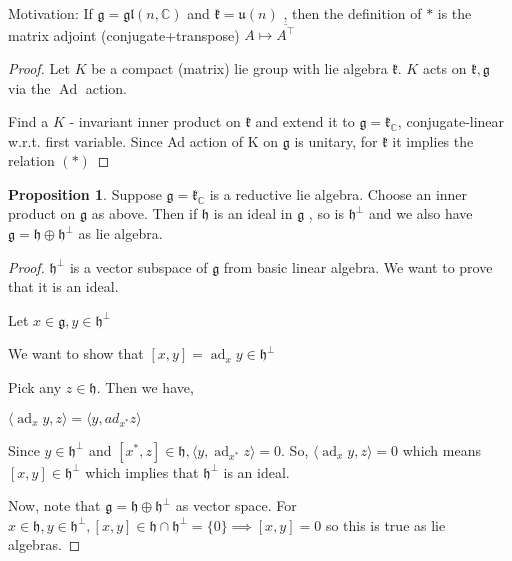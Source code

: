 \documentclass{article}
\theoremstyle{definition}
\newtheorem{proposition}{Proposition}
\newcommand{\ad}{\operatorname{ad}}
\newcommand{\Ad}{\operatorname{Ad}}
\begin{document}
Motivation: If \(\mathfrak{g} =\mathfrak{gl} (n,\mathbb{C} )\) and \(\mathfrak{k} =\mathfrak{u} (n)\) , then the definition of \(*\) is the matrix adjoint (conjugate+transpose) \(A\mapsto \overline{A^{\top} } \) 

\begin{proof}
    Let \(K\) be a compact (matrix) lie group with lie algebra \(\mathfrak{k} \). \(K\) acts on \(\mathfrak{k},\mathfrak{g} \) via the \(\Ad\) action.
    
    Find a \(K\) - invariant inner product on \(\mathfrak{k} \) and extend it to \(\mathfrak{g} =\mathfrak{k} _\mathbb{C} \), conjugate-linear w.r.t. first variable. Since Ad action of K on \(\mathfrak{g} \) is unitary, for \(\mathfrak{k} \) it implies the relation \((*)\)  
    
\end{proof}

\begin{proposition}
    Suppose \(\mathfrak{g} =\mathfrak{k} _\mathbb{C} \) is a reductive lie algebra. Choose an inner product on \(\mathfrak{g} \) as above. Then if \(\mathfrak{h} \) is an ideal in \(\mathfrak{g} \) , so is \(\mathfrak{h} ^{\perp} \) and we also have \(\mathfrak{g} =\mathfrak{h} \oplus \mathfrak{h} ^{\perp} \) as lie algebra.
\end{proposition}

\begin{proof}
    \(\mathfrak{h} ^{\perp} \) is a vector subspace of \(\mathfrak{g} \) from basic linear algebra. We want to prove that it is an ideal.

    Let \(x\in \mathfrak{g} ,y\in \mathfrak{h} ^{\perp} \)

    We want to show that \([x,y]=\ad_x y\in \mathfrak{h} ^{\perp} \) 

    Pick any \(z\in \mathfrak{h}\). Then we have,
    
    \(\langle \ad_x y,z \rangle = \langle y,ad_{x^{\ast} }z \rangle \) 

    Since \(y\in \mathfrak{h} ^{\perp} \) and \([x^{\ast} ,z]\in \mathfrak{h}, \langle y,\ad_{x^{\ast} }z \rangle =0\). So, \(\langle \ad_x y,z \rangle =0\) which means \([x,y]\in \mathfrak{h}^{\perp} \) which implies that \(\mathfrak{h} ^{\perp} \) is an ideal.
    
    Now, note that \(\mathfrak{g} =\mathfrak{h} \oplus \mathfrak{h} ^{\perp} \) as vector space. For \(x\in \mathfrak{h} ,y\in \mathfrak{h} ^{\perp} ,[x,y]\in \mathfrak{h} \cap \mathfrak{h} ^{\perp} =\{0\}\implies [x,y]=0\) so this is true as lie algebras.
    
\end{proof}
\end{document}
